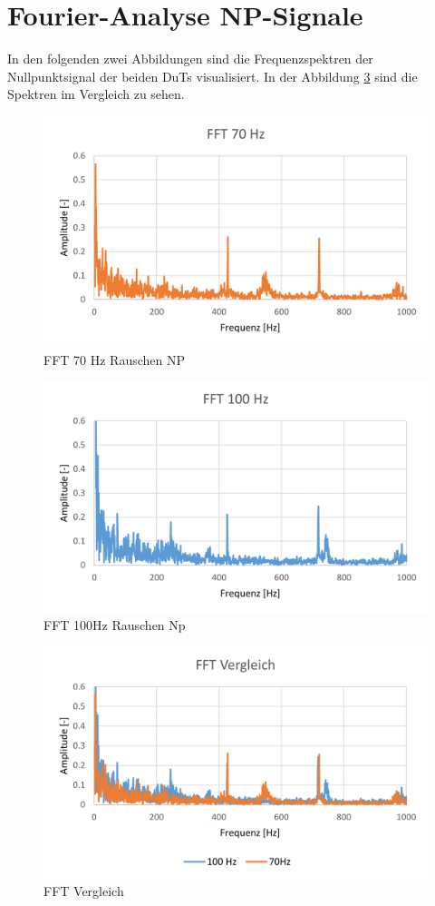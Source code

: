 \documentclass[12pt,a4paper]{article}
\begin{document}
\section{Fourier-Analyse NP-Signale}
In den folgenden zwei Abbildungen sind die Frequenzspektren der Nullpunktsignal der beiden DuTs visualisiert. In der Abbildung \ref{fig:fftvergleich} sind die Spektren im Vergleich zu sehen.
\begin{figure}[H]
	\centering
	\includegraphics[width=1\linewidth]{imgs/FFT_70Hz}
	\caption{FFT 70 Hz Rauschen NP}
	\label{fig:fft70hz}
\end{figure}
\begin{figure}[H]
	\centering
	\includegraphics[width=1\linewidth]{imgs/FFT_100Hz}
	\caption{FFT 100Hz Rauschen Np}
	\label{fig:fft100hz}
\end{figure}
\begin{figure}[H]
	\centering
	\includegraphics[width=1\linewidth]{imgs/FFT_Vergleich}
	\caption{FFT Vergleich}
	\label{fig:fftvergleich}
\end{figure}
\end{document}
